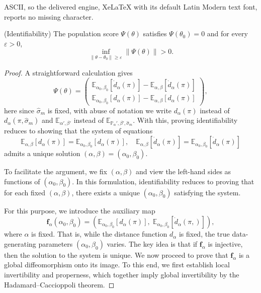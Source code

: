 \documentclass[10pt,a4paper]{amsart}
\newcommand{\E}{ \mathbb{E}}
\renewcommand{\P}{\mathbb{P}}
\begin{document}
ASCII, so the delivered engine, XeLaTeX with its default Latin Modern text font, reports no missing character.
\begin{lemma}(Identifiability)\label{lm: identifiable}
The population score \(\Psi(\theta)\) satisfies
\(\Psi(\theta_0)=0\) and for every \(\varepsilon>0\),
\[
\inf_{\|\theta-\theta_0\|\ge\varepsilon}
\|\Psi(\theta)\|
>0.
\]
\end{lemma}

\begin{proof}
A straightforward calculation gives
\[
\Psi(\theta)
=
\begin{pmatrix}
\mathbb{E}_{\alpha_0,\beta_0}\left[\dot{d}_\alpha(\pi)\right] - \mathbb{E}_{\alpha,\beta}\left[\dot{d}_\alpha(\pi)\right]
\\[6pt]
\mathbb{E}_{\alpha_0,\beta_0}\left[d_\alpha(\pi)\right] - \mathbb{E}_{\alpha,\beta}\left[d_\alpha(\pi)\right]
\end{pmatrix},
\]
here since $\hat\sigma_m$ is fixed, with abuse of notation we write $d_\alpha(\pi)$ instead of $d_\alpha(\pi,\hat\sigma_m)$ and $\E_{\alpha',\beta'}$ instead of $\E_{\P{_\alpha',\beta',\hat \sigma_m}}$.
With this, proving identifiability reduces to showing that the system of equations
\[
\mathbb{E}_{\alpha,\beta}[d_\alpha(\pi)] = \mathbb{E}_{\alpha_0,\beta_0}[d_\alpha(\pi)],
\quad
\mathbb{E}_{\alpha,\beta}[\dot{d}_\alpha(\pi)] = \mathbb{E}_{\alpha_0,\beta_0}[\dot{d}_\alpha(\pi)]
\]
admits a unique solution \((\alpha,\beta) = (\alpha_0,\beta_0)\).

To facilitate the argument, we fix \((\alpha,\beta)\) and view the left-hand sides as functions of \((\alpha_0,\beta_0)\). In this formulation, identifiability reduces to proving that for each fixed \((\alpha,\beta)\), there exists a unique \((\alpha_0,\beta_0)\) satisfying the system.

For this purpose, we introduce the auxiliary map
\[
\boldsymbol{f}_{\alpha}(\alpha_0,\beta_0)
=
\left(
\mathbb{E}_{{\alpha_0,\beta_0}}[d_{\alpha}(\pi)],\;
\mathbb{E}_{{\alpha_0,\beta_0}}[\dot{d}_{\alpha}(\pi,)]
\right),
\]
where \(\alpha \) is fixed. That is, while the distance function $d_\alpha$ is fixed, the true data-generating parameters \((\alpha_0,\beta_0)\) varies.
The key idea is that if \(\boldsymbol{f}_{\alpha}\) is injective, then the solution to the system is unique. We now proceed to prove that \(\boldsymbol{f}_{\alpha}\) is a global diffeomorphism onto its image. To this end, we first establish local invertibility and properness, which together imply global invertibility by the Hadamard--Caccioppoli theorem.




\end{proof}
\end{document}
